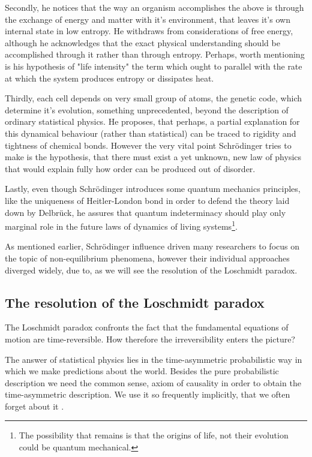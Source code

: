 \documentclass[a4paper,12pt]{article}
\begin{document}
Secondly, he notices that the way an organism accomplishes the above is through the exchange of energy and matter with it's environment, that leaves it's own internal state in low entropy. He withdraws from considerations of free energy, although he acknowledges that the exact physical understanding should be accomplished through it rather than through entropy. Perhaps, worth mentioning is his hypothesis of "life intensity" the term which ought to parallel with the rate at which the system produces entropy or dissipates heat.

Thirdly, each cell depends on very small group of atoms, the genetic code, which determine it's evolution, something unprecedented, beyond the description of ordinary statistical physics. He proposes, that perhaps, a partial explanation for this dynamical behaviour (rather than statistical) can be traced to rigidity and tightness of chemical bonds. However the very vital point Schrödinger tries to make is the hypothesis, that there must exist a yet unknown, new law of physics that would explain fully how order can be produced out of disorder. 

Lastly, even though Schrödinger introduces some quantum mechanics principles, like the uniqueness of Heitler-London bond in order to defend the theory laid down by Delbrück, he assures that quantum indeterminacy should play only marginal role in the future laws of dynamics of living systems\footnote{The possibility that remains is that the origins of life, not their evolution could be quantum mechanical.}.

As mentioned earlier, Schrödinger influence driven many researchers to focus on the topic of non-equilibrium phenomena, however their individual approaches diverged widely, due to, as we will see the resolution of the Loschmidt paradox.

\subsection{The resolution of the Loschmidt paradox }

The Loschmidt paradox confronts the fact that the fundamental equations of motion are time-reversible. How therefore the irreversibility enters the picture?

The answer of statistical physics lies in the time-asymmetric probabilistic way in which we make predictions about the world. 
Besides the pure probabilistic description we need the common sense, axiom of causality in order to obtain the time-asymmetric description.
We use it so frequently implicitly, that we often forget about it \cite{Evans:2016tq}. 
\end{document}
